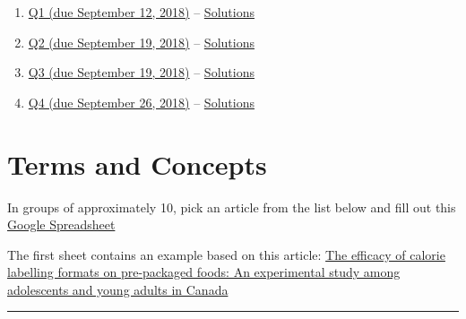 \documentclass[]{book}
\providecommand{\tightlist}{%
  \setlength{\itemsep}{0pt}\setlength{\parskip}{0pt}}
\providecommand{\tightlist}{%
  \setlength{\itemsep}{0pt}\setlength{\parskip}{0pt}}
\theoremstyle{definition}
\theoremstyle{definition}
\theoremstyle{definition}
\theoremstyle{remark}
\begin{document}
\begin{enumerate}
\def\labelenumi{\arabic{enumi}.}
\tightlist
\item
  \href{https://github.com/sahirbhatnagar/EPIB607/raw/master/dalite/001_hist_mean/001-hist-mean.pdf}{Q1
  (due September 12, 2018)} --
  \href{https://github.com/sahirbhatnagar/EPIB607/raw/master/dalite/001_hist_mean/001-hist-mean-sol.pdf}{Solutions}
\item
  \href{https://github.com/sahirbhatnagar/EPIB607/raw/master/dalite/002_box_sd_curves/002-box-sd-curves.pdf}{Q2
  (due September 19, 2018)} --
  \href{https://github.com/sahirbhatnagar/EPIB607/raw/master/dalite/002_box_sd_curves/002-box-sd-curves-sol.pdf}{Solutions}
\item
  \href{https://github.com/sahirbhatnagar/EPIB607/raw/master/dalite/003_parameters_samplingdist_CLT/003-parameter-samplingdist-CLT.pdf}{Q3
  (due September 19, 2018)} --
  \href{https://github.com/sahirbhatnagar/EPIB607/raw/master/dalite/003_parameters_samplingdist_CLT/003-parameter-samplingdist-CLT-sol.pdf}{Solutions}
\item
  \href{https://github.com/sahirbhatnagar/EPIB607/raw/master/dalite/004_normal_ci/004-normal-ci.pdf}{Q4
  (due September 26, 2018)} --
  \href{https://github.com/sahirbhatnagar/EPIB607/raw/master/dalite/004_normal_ci/004-normal-ci-sol.pdf}{Solutions}
\end{enumerate}

\chapter{Terms and Concepts}\label{terms-and-concepts}

In groups of approximately 10, pick an article from the list below and
fill out this
\href{https://docs.google.com/spreadsheets/d/1Bq10eh3q8aUHuy4VWwBHVud-KAhnm31owKzc0Ie3J24/edit?usp=sharing}{Google
Spreadsheet}

The first sheet contains an example based on this article:
\href{https://www.dropbox.com/s/hg5wk5ea2bg5t5o/CalorieLabellingPackagesFoods.pdf?dl=1}{The
efficacy of calorie labelling formats on pre-packaged foods: An
experimental study among adolescents and young adults in Canada}

\begin{center}\rule{0.5\linewidth}{\linethickness}\end{center}
\end{document}
